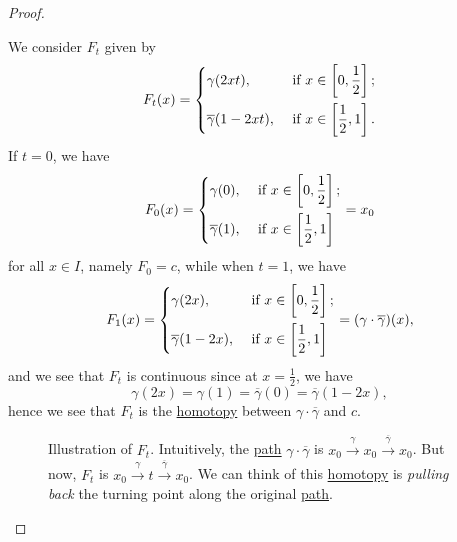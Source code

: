 \begin{proof}
\begin{itemize}
		      \par We consider \(F_t\) given by
		      \[
			      F_{t}(x) = \begin{dcases}
				      \gamma(2xt),              & \text{ if } x\in\left[0, \frac{1}{2}\right]; \\
				      \overline{\gamma}(1-2xt), & \text{ if } x\in\left[\frac{1}{2}, 1\right].
			      \end{dcases}
		      \]
		      If \(t = 0\), we have
		      \[
			      F_{0}(x) = \begin{dcases}
				      \gamma(0),            & \text{ if } x\in\left[0, \frac{1}{2}\right]; \\
				      \overline{\gamma}(1), & \text{ if } x\in\left[\frac{1}{2}, 1\right]
			      \end{dcases} = x_0
		      \]
		      for all \(x\in I\), namely \(F_0 = c\), while when \(t = 1\), we have
		      \[
			      F_{1}(x) = \begin{dcases}
				      \gamma(2x),              & \text{ if } x\in\left[0, \frac{1}{2}\right]; \\
				      \overline{\gamma}(1-2x), & \text{ if } x\in\left[\frac{1}{2}, 1\right]
			      \end{dcases} = (\gamma\cdot \overline{\gamma})(x),
		      \]
		      and we see that \(F_t\) is continuous since at \(x = \frac{1}{2}\), we have
		      \[
			      \gamma(2x) = \gamma(1) = \overline{\gamma} (0) = \overline{\gamma} (1 - 2x),
		      \]
		      hence we see that \(F_{t}\) is the \hyperref[def:homotopy]{homotopy} between \(\gamma\cdot \overline{\gamma} \) and \(c\).
		      \begin{figure}[H]
			      \centering
			      \caption{Illustration of \(F_t\). Intuitively, the \hyperref[def:path]{path} \(\gamma\cdot \overline{\gamma}\) is \(x_0 \overset{\gamma}{\to} x_0 \overset{\overline{\gamma} }{\to} x_0\).
				      But now, \(F_t\) is \(x_0 \overset{\gamma}{\to} t \overset{\overline{\gamma} }{\to} x_0\). We can think of this \hyperref[def:homotopy]{homotopy} is \emph{pulling back}
				      the turning point along the original \hyperref[def:path]{path}.}
			      \label{fig:def:fundamental-group}
		      \end{figure}
	\end{itemize}
\end{proof}


